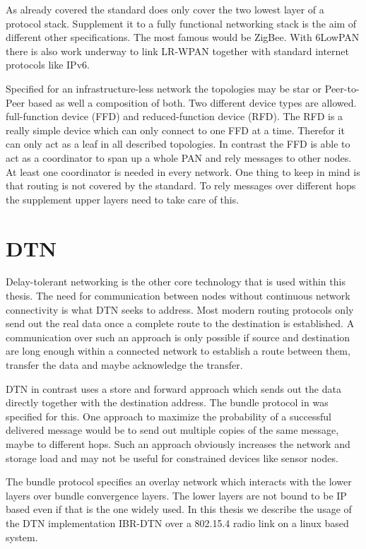 As already covered the standard does only cover the two lowest layer of a
protocol stack. Supplement it to a fully functional networking stack is the aim
of different other specifications. The most famous would be ZigBee. With 6LowPAN
there is also work underway to link LR-WPAN together with standard internet
protocols like IPv6.

Specified for an infrastructure-less network the topologies may be star or
Peer-to-Peer based as well a composition of both. Two different device types are
allowed. full-function device (FFD) and reduced-function device (RFD). The RFD
is a really simple device which can only connect to one FFD at a time. Therefor
it can only act as a leaf in all described topologies. In contrast the FFD is
able to act as a coordinator to span up a whole PAN and rely messages to other
nodes. At least one coordinator is needed in every network. One thing to keep in
mind is that routing is not covered by the standard. To rely messages over
different hops the supplement upper layers need to take care of this.

\section{DTN}
\label{introdtn}
Delay-tolerant networking is the other core technology that is used within this
thesis. The need for communication between nodes without continuous network
connectivity is what DTN seeks to address. Most modern routing protocols only
send out the real data once a complete route to the destination is established.
A communication over such an approach is only possible if source and destination
are long enough within a connected network to establish a route between them,
transfer the data and maybe acknowledge the transfer.

DTN in contrast uses a store and forward approach which sends out the data
directly together with the destination address. The bundle protocol in
\cite{RFC5050} was specified for this. One approach to maximize the probability
of a successful delivered message would be to send out multiple copies of the
same message, maybe to different hops. Such an approach obviously increases the
network and storage load and may not be useful for constrained devices like
sensor nodes.

The bundle protocol specifies an overlay network which interacts with the lower
layers over bundle convergence layers. The lower layers are not bound to be IP
based even if that is the one widely used. In this thesis we describe the usage
of the DTN implementation IBR-DTN over a 802.15.4 radio link on a linux based
system.
